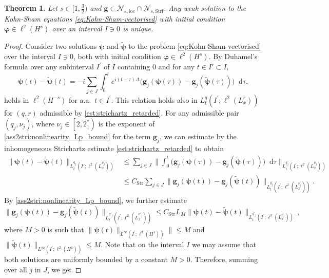 \documentclass[12pt,a4paper]{amsart}
\newtheorem{theorem}{Theorem}[section]
\numberwithin{equation}{section}
\newcommand{\ulg}{\boldsymbol{g}}
\newcommand{\ulpsi}{\boldsymbol{\psi}}
\newcommand{\ulphi}{\boldsymbol{\varphi}}
\newcommand*\diff{\mathop{}\!\mathrm{d}}
\newcommand{\twoastsone}{{2^*_1}}
\newcommand{\Nloc}{\mathscr{N}_{s,\mathrm{loc}}}
\newcommand{\NStri}{\mathscr{N}_{s,\mathrm{Stri}}}
\begin{document}
	\begin{theorem}\label{thm:uniqueness}
		Let $s \in [1,\frac32) $ and $\ulg\in \Nloc\cap\NStri$. Any weak solution to the Kohn-Sham equations \eqref{eq:Kohn-Sham-vectorised} with initial condition $\ulphi \in \ell^2(H^s) $ over an interval $I \ni 0$ is unique.
	\end{theorem}
	\begin{proof}
		Consider two solutions $\ulpsi$ and $ \tilde{\ulpsi}$ to the problem \eqref{eq:Kohn-Sham-vectorised} over the interval $I \ni 0 $, both with initial condition $ \ulphi \in \ell^2(H^s) $. By Duhamel's formula over any subinterval $I^\prime$ of $I$ containing $0$ and for any $t \in I' \subset I$, 
		\begin{equation}
			\ulpsi(t) - \tilde{\ulpsi}(t) = -i \sum_{j\in J}\int_{0}^t e^{i(t-\tau)\Delta}  \big(\ulg_j(\ulpsi(\tau)) - \ulg_j( \tilde{\ulpsi}(\tau)) \big) \diff \tau ,
		\end{equation}
		holds in $ \ell^2(H^{-s})$ for a.a.~$ t \in I^\prime $. This relation holds also in $L^q_t(I^\prime;\ell^2(L^{r}_x))$ for $(q,r)$ admissible by \eqref{est:strichartz_retarded}. For any admissible pair $(q_{j},\nu_{j})$, where $\nu_{j} \in \left[ 2, \twoastsone  \right) $ is the exponent of \ref{ass2stri:nonlinearity_Lp_bound} for the term $\ulg_{j} $, we can estimate by the inhomogeneous Strichartz estimate \eqref{est:strichartz_retarded} to obtain
		\begin{align}
			\| \ulpsi(t) - \tilde{\ulpsi}(t) \|_{L^{q_{j}}_t(I';\ell^2(L^{\nu_{j}}_x))}
			& \leq \sum_{j\in J} \| \int_{0}^{t}  \big(\ulg_j(\ulpsi(\tau)) - \ulg_j( \tilde{\ulpsi}(\tau)) \big) \diff \tau \|_{L^{q_j}_t(I^\prime;\ell^2(L^{\nu_j}_x))} \\
			& \leq  C_{\mathrm{Str}} \sum_{j\in J}\| \ulg_j(\ulpsi(t)) - \ulg_j( \tilde{\ulpsi}(t) ) \|_{L_t^{q_j^\prime}(I^\prime;\ell^2(L_x^{\nu_j^\prime}))}.
		\end{align}
		By \ref{ass2stri:nonlinearity_Lp_bound}, we further estimate
		\begin{equation}
			\| \ulg_j(\ulpsi(t)) - \ulg_j(\tilde{\ulpsi}(t)) \|_{L^{q'_{j}}_t(I^\prime;\ell^2(L^{\nu'_{j}}_x))} 
			\leq  C_{\mathrm{Str}} L_M \| \ulpsi(t) - \tilde{\ulpsi}(t) \|_{L_t^{q'_j}(I^\prime;\ell^2(L_x^{\nu_j}))} \,,
		\end{equation}
		where $M>0$ is such that $\| \ulpsi(t) \|_{L^{\infty}(I^\prime;\ell^2(H^1))}\|\le M$ and 
		$\| \tilde{\ulpsi} (t) \|_{L^{\infty}(I^\prime;\ell^2(H^1))}\leq M$. 
		Note that on the interval $I$ we may assume that both solutions are uniformly bounded by a constant $M>0$. Therefore, summing over all $j$ in $J$, we get

\end{proof}
\end{document}
